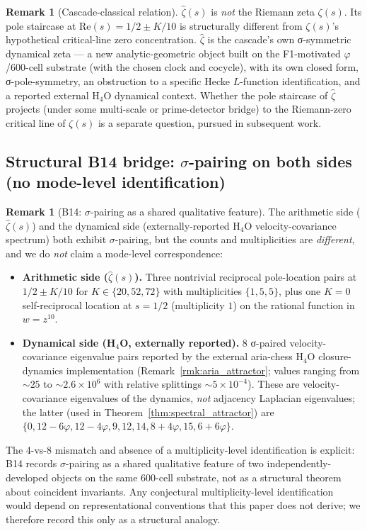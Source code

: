\documentclass[11pt, a4paper]{amsart}
\theoremstyle{definition}
\newtheorem{remark}[theorem]{Remark}
\begin{document}
\begin{remark}[Cascade-classical relation]
$\widehat\zeta(s)$ is \emph{not} the Riemann zeta $\zeta(s)$. Its pole
staircase at $\mathrm{Re}(s) = 1/2 \pm K/10$ is structurally
different from $\zeta(s)$'s hypothetical critical-line zero
concentration. $\widehat\zeta$ is the cascade's own
σ-symmetric dynamical zeta — a new analytic-geometric object
built on the F1-motivated $\varphi$/600-cell substrate (with the
chosen clock and cocycle), with its own closed form,
σ-pole-symmetry, an obstruction to a specific Hecke $L$-function
identification, and a reported external H$_4$O dynamical context. Whether the pole staircase
of $\widehat\zeta$ projects (under some multi-scale or prime-detector
bridge) to the Riemann-zero critical line of $\zeta(s)$ is a
separate question, pursued in subsequent work.
\end{remark}

\subsection{Structural B14 bridge: $\sigma$-pairing on both sides (no mode-level identification)}\label{subsec:B14}

\begin{remark}[B14: $\sigma$-pairing as a shared qualitative feature]\label{rmk:B14}
The arithmetic side ($\widehat\zeta(s)$) and the dynamical side
(externally-reported H$_4$O velocity-covariance spectrum) both
exhibit $\sigma$-pairing, but the counts and multiplicities are
\emph{different}, and we do \emph{not} claim a mode-level
correspondence:
\begin{itemize}
\item \textbf{Arithmetic side ($\widehat\zeta(s)$).}
  Three nontrivial reciprocal pole-location pairs at
  $1/2 \pm K/10$ for $K \in \{20, 52, 72\}$ with multiplicities
  $\{1, 5, 5\}$, plus one $K = 0$ self-reciprocal location at
  $s = 1/2$ (multiplicity $1$) on the rational function in
  $w = z^{10}$.
\item \textbf{Dynamical side (H$_4$O, externally reported).}
  8 σ-paired velocity-covariance eigenvalue pairs reported by the
  external aria-chess H$_4$O closure-dynamics implementation
  (Remark~\ref{rmk:aria_attractor}; values ranging from $\sim 25$
  to $\sim 2.6 \times 10^6$ with relative splittings
  $\sim 5 \times 10^{-4}$).  These are velocity-covariance
  eigenvalues of the dynamics, \emph{not} adjacency Laplacian
  eigenvalues; the latter (used in
  Theorem~\ref{thm:spectral_attractor}) are
  $\{0, 12-6\varphi, 12-4\varphi, 9, 12, 14, 8+4\varphi, 15, 6+6\varphi\}$.
\end{itemize}
The 4-vs-8 mismatch and absence of a multiplicity-level identification
is explicit: B14 records $\sigma$-pairing as a shared qualitative
feature of two independently-developed objects on the same 600-cell
substrate, not as a structural theorem about coincident invariants.
Any conjectural multiplicity-level identification would depend on
representational conventions that this paper does not derive; we
therefore record this only as a structural analogy.
\end{remark}
\end{document}
